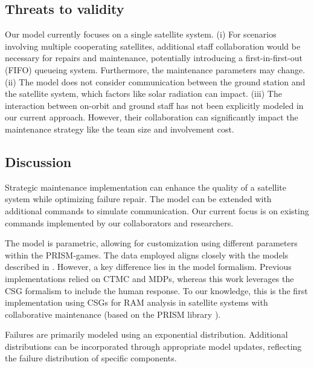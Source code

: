 \subsection{Threats to validity}
Our model currently focuses on a single satellite system. (i) For scenarios involving multiple cooperating satellites, additional staff collaboration would be necessary for repairs and maintenance, potentially introducing a first-in-first-out (FIFO) queueing system.  Furthermore, the maintenance parameters may change. (ii) The model does not consider communication between the ground station and the satellite system, which factors like solar radiation can impact. (iii) The interaction between on-orbit and ground staff has not been explicitly modeled in our current approach. However, their collaboration can significantly impact the maintenance strategy like the team size and involvement cost.


\subsection{Discussion}


Strategic maintenance implementation can enhance the quality of a satellite system while optimizing failure repair. The model can be extended with additional commands to simulate communication. Our current focus is on existing commands implemented by our collaborators and researchers.

The model is parametric, allowing for customization using different parameters within the PRISM-games. The data employed aligns closely with the models described in  \cite{Hoque2015,Yu2015}. However, a key difference lies in the model formalism. Previous implementations relied on CTMC and MDPs, whereas this work leverages the CSG formalism to include the human response. To our knowledge, this is the first implementation using CSGs for RAM analysis in satellite systems with collaborative maintenance (based on the PRISM library \cite{prismgames}).

Failures are primarily modeled using an exponential distribution. Additional distributions can be incorporated through appropriate model updates, reflecting the failure distribution of specific components.
